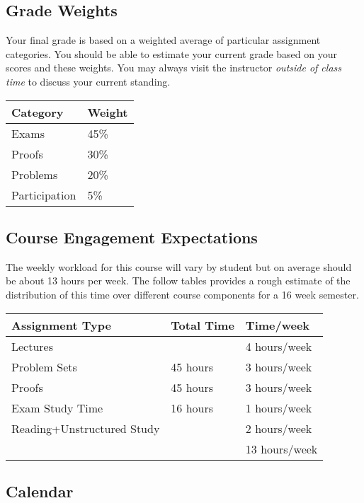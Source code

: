 \documentclass[10pt]{article}
\begin{document}
\subsection{Grade Weights}

Your final grade is based on a weighted average of particular assignment categories.  You should be able to estimate your current grade based on your scores and these weights.  You may always visit the instructor \textit{outside of class time} to discuss your current standing.

\begin{center}
  \begin{tabular}{ll}
  Category & Weight \\ \toprule
    Exams & 45\% \\ %
    Proofs & 30\% \\ %
    Problems & 20\% \\ %
    Participation & 5\%
  \end{tabular}
\end{center}


\subsection{Course Engagement Expectations}

The weekly workload for this course will vary by student but on average should be about 13 hours per week.  The follow tables provides a rough estimate of the distribution of this time over different course components for a 16 week semester.
\begin{center}
\begin{tabular}{lll}
Assignment Type & Total Time & Time/week \\ \toprule
Lectures &      & 4 hours/week \\
Problem Sets & 45 hours        & 3 hours/week \\
Proofs & 45 hours        & 3 hours/week \\
Exam Study Time & 16 hours  & 1 hours/week \\
Reading+Unstructured Study & & 2 hours/week \\
\bottomrule
& & 13 hours/week
\end{tabular}
\end{center}


\subsection{Calendar}
\end{document}

